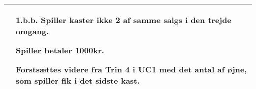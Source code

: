\documentclass[class=article, crop=false]{standalone}
\begin{document}
\begin{table}[H]
\begin{tabularx}{\textwidth}{|l|X|}
                                    & \textbf{1.b.b.} Spiller kaster ikke 2 af samme salgs i den trejde omgang.
                                    \begin{enumerate} \begin{tabenum}
                                      \item Spiller betaler 1000kr.
                                      \item Forstsættes videre fra Trin 4 i UC1 med det antal af øjne, som spiller fik i det sidste kast.
                                    \end{tabenum} \end{enumerate}
                                    \\


            \hline

        \end{tabularx}


    \end{table}
\end{document}
